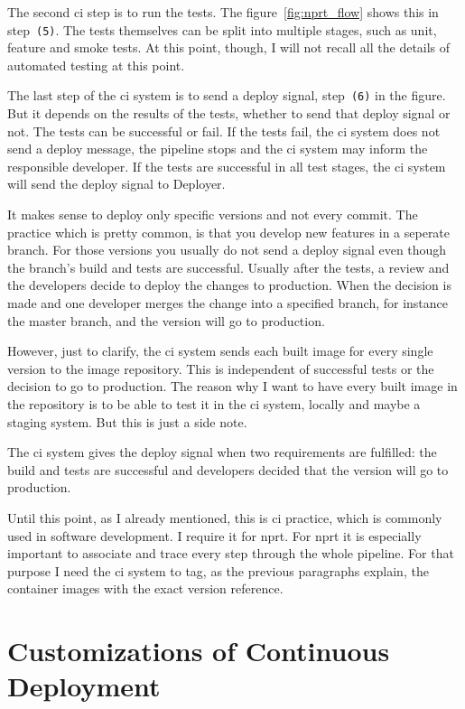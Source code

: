 The second \gls{ci} step is to run the tests. The figure~\ref{fig:nprt_flow} shows this in
step~\texttt{(5)}. The tests themselves can be split into multiple stages, such as unit,
feature and smoke tests. At this point, though, I will not recall all the details of
automated testing at this point.

The last step of the \gls{ci} system is to send a deploy signal, step~\texttt{(6)} in the
figure. But it depends on the results of the tests, whether to send that deploy signal or
not. The tests can be successful or fail. If the tests fail, the \gls{ci} system does not
send a deploy message, the pipeline stops and the \gls{ci} system may inform the
responsible developer. If the tests are successful in all test stages, the \gls{ci} system
will send the deploy signal to Deployer.

It makes sense to deploy only specific versions and not every commit. The practice which
is pretty common, is that you develop new features in a seperate branch. For those
versions you usually do not send a deploy signal even though the branch's build and tests
are successful. Usually after the tests, a review and the developers decide to deploy the
changes to production. When the decision is made and one developer merges the change into
a specified branch, for instance the master branch, and the version will go to production.

However, just to clarify, the \gls{ci} system sends each built image for every single
version to the image repository. This is independent of successful tests or the decision
to go to production. The reason why I want to have every built image in the repository is
to be able to test it in the \gls{ci} system, locally and maybe a staging system. But this
is just a side note.

The \gls{ci} system gives the deploy signal when two requirements are fulfilled: the build
and tests are successful and developers decided that the version will go to production.

Until this point, as I already mentioned, this is \gls{ci} practice, which is commonly
used in software development. I require it for \gls{nprt}. For \gls{nprt} it is especially
important to associate and trace every step through the whole pipeline. For that purpose I
need the \gls{ci} system to tag, as the previous paragraphs explain, the container images
with the exact version reference.

\section{Customizations of Continuous Deployment}

